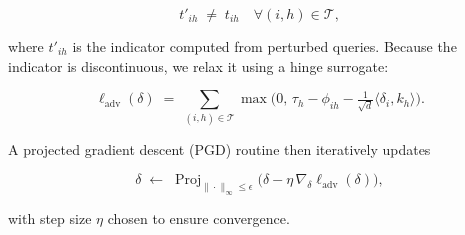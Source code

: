 \[






t'_{ih}\;\neq\;t_{ih}\quad\forall(i,h)\in\mathcal{T},






\]






where $t'_{ih}$ is the indicator computed from perturbed queries.  Because the indicator is discontinuous, we relax it using a hinge surrogate:






\[






\ell_{\text{adv}}(\delta)






  \;=\;\sum_{(i,h)\in\mathcal{T}}






    \max\!\bigl(0,\,\tau_h-\phi_{ih}-\tfrac{1}{\sqrt{d}}\langle \delta_i,k_h\rangle\bigr).






\]






A projected gradient descent (PGD) routine then iteratively updates






\[






\delta \;\leftarrow\;






\operatorname{Proj}_{\|\cdot\|_\infty\le\epsilon}\!\bigl(






  \delta - \eta\,\nabla_\delta \ell_{\text{adv}}(\delta)\bigr),






\]






with step size $\eta$ chosen to ensure convergence.













